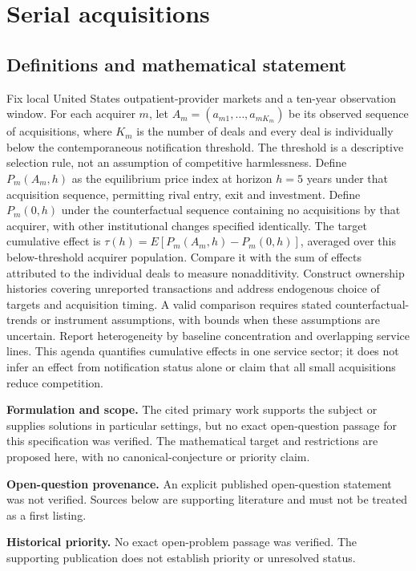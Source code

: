 \documentclass[11pt]{article}
\begin{document}
\section*{Serial acquisitions}\label{30007677}
\subsection{Definitions and mathematical statement}
Fix local United States outpatient-provider markets and a ten-year observation window. For each acquirer \(m\), let \(A_m=(a_{m1},\ldots,a_{mK_m})\) be its observed sequence of acquisitions, where \(K_m\) is the number of deals and every deal is individually below the contemporaneous notification threshold. The threshold is a descriptive selection rule, not an assumption of competitive harmlessness. Define \(P_m(A_m,h)\) as the equilibrium price index at horizon \(h=5\) years under that acquisition sequence, permitting rival entry, exit and investment. Define \(P_m(0,h)\) under the counterfactual sequence containing no acquisitions by that acquirer, with other institutional changes specified identically. The target cumulative effect is \(\tau(h)=E[P_m(A_m,h)-P_m(0,h)]\), averaged over this below-threshold acquirer population. Compare it with the sum of effects attributed to the individual deals to measure nonadditivity. Construct ownership histories covering unreported transactions and address endogenous choice of targets and acquisition timing. A valid comparison requires stated counterfactual-trends or instrument assumptions, with bounds when these assumptions are uncertain. Report heterogeneity by baseline concentration and overlapping service lines. This agenda quantifies cumulative effects in one service sector; it does not infer an effect from notification status alone or claim that all small acquisitions reduce competition.

\par\textbf{Formulation and scope.} The cited primary work supports the subject or supplies solutions in particular settings, but no exact open-question passage for this specification was verified. The mathematical target and restrictions are proposed here, with no canonical-conjecture or priority claim.

\par\textbf{Open-question provenance.} An explicit published open-question statement was not verified. Sources below are supporting literature and must not be treated as a first listing.

\par\textbf{Historical priority.} No exact open-problem passage was verified. The supporting publication does not establish priority or unresolved status.
\end{document}
